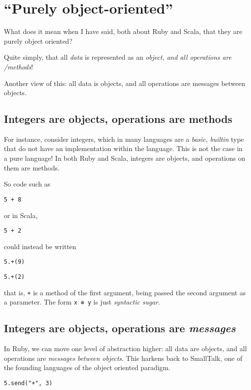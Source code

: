 \documentclass[11pt]{article}
\begin{document}
\section{“Purely object-oriented”}
\label{sec:orgf5b61a8}
What does it mean when I have said, both about Ruby and Scala,
that they are purely object oriented?

Quite simply, that all \emph{data} is represented as an \emph{object,
and all operations are /methods}!

Another view of this: all data is objects,
and all operations are messages between objects.

\subsection{Integers are objects, operations are methods}
\label{sec:orgf169b17}
For instance, consider integers, which in many languages are
a \emph{basic}, \emph{builtin} type that do not have an implementation
within the language. This is not the case in a pure language!
In both Ruby and Scala, integers are objects,
and operations on them are methods.

So code such as
\begin{verbatim}
5 + 8
\end{verbatim}

or in Scala,
\begin{verbatim}
5 + 2
\end{verbatim}

could instead be written
\begin{verbatim}
5.+(9)
\end{verbatim}

\begin{verbatim}
5.+(2)
\end{verbatim}

that is, \texttt{+} is a method of the first argument, being passed
the second argument as a parameter.
The form \texttt{x ⊕ y} is just \emph{syntactic sugar}.

\subsection{Integers are objects, operations are \emph{messages}}
\label{sec:org7af4f3d}
In Ruby, we can move one level of abstraction higher:
all data are objects, and all operations
are \emph{messages between objects}.
This harkens back to SmallTalk, one of the founding languages
of the object oriented paradigm.
\begin{verbatim}
5.send("+", 3)
\end{verbatim}
\end{document}

